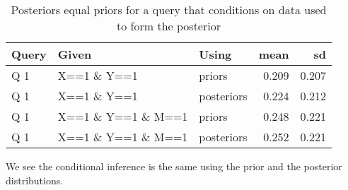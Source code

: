 \documentclass[
  12pt,
]{book}
\newenvironment{Shaded}{\begin{snugshade}}{\end{snugshade}}
\newcommand{\DataTypeTok}[1]{\textcolor[rgb]{0.13,0.29,0.53}{#1}}
\newcommand{\DecValTok}[1]{\textcolor[rgb]{0.00,0.00,0.81}{#1}}
\newcommand{\KeywordTok}[1]{\textcolor[rgb]{0.13,0.29,0.53}{\textbf{#1}}}
\newcommand{\NormalTok}[1]{#1}
\newcommand{\OperatorTok}[1]{\textcolor[rgb]{0.81,0.36,0.00}{\textbf{#1}}}
\newcommand{\OtherTok}[1]{\textcolor[rgb]{0.56,0.35,0.01}{#1}}
\newcommand{\StringTok}[1]{\textcolor[rgb]{0.31,0.60,0.02}{#1}}
\begin{document}
\begin{Shaded}
\end{Shaded}

\begin{table}

\caption{\label{tab:unnamed-chunk-48}Posteriors equal priors for a query that conditions on data used to form the posterior }
\centering
\begin{tabular}[t]{l|l|l|r|r}
\hline
Query & Given & Using & mean & sd\\
\hline
Q 1 & X==1 \& Y==1 & priors & 0.209 & 0.207\\
\hline
Q 1 & X==1 \& Y==1 & posteriors & 0.224 & 0.212\\
\hline
Q 1 & X==1 \& Y==1 \& M==1 & priors & 0.248 & 0.221\\
\hline
Q 1 & X==1 \& Y==1 \& M==1 & posteriors & 0.252 & 0.221\\
\hline
\end{tabular}
\end{table}

We see the conditional inference is the same using the prior and the posterior distributions.
\end{document}
